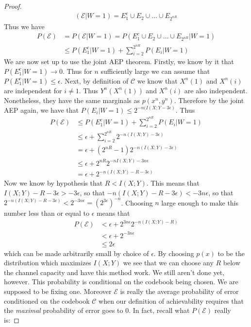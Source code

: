 \documentclass{article}
\theoremstyle{definition}
\theoremstyle{plain}
\begin{document}
\begin{proof}
\begin{align}
	(\mathcal{E}|W=1) = E_1^c \cup E_2 \cup \ldots \cup E_{2^{nR}}
\end{align}
Thus we have
\begin{align}
	P(\mathcal{E}) &= P(\mathcal{E}|W=1) = P(E_1^c \cup E_2 \cup \ldots \cup E_{2^{nR}}|W=1) \\
		&\leq P(E_1^c|W=1) + \sum_{i=2}^{2^{nR}}P(E_i|W=1)
\end{align}
We are now set up to use the joint AEP theorem. Firstly, we know by it that $P(E^c_1|W=1) \to 0$. Thus for $n$ sufficiently large we can assume that $P(E^c_1|W=1) \leq \epsilon$. Next, by definition of $\mathcal{C}$ we know that $X^n(1)$ and $X^n(i)$ are independent for $i \neq 1$. Thus $Y^n(X^n(1))$ and $X^n(i)$ are also independent. Nonetheless, they have the same marginals as $p(x^n,y^n)$. Therefore by the joint AEP again, we have that $P(E_i|W=1) \leq 2^{-n(I(X;Y-3\epsilon)}$. Thus
\begin{align}
	P(\mathcal{E}) &\leq P(E_1^c|W=1) + \sum_{i=2}^{2^{nR}}P(E_i|W=1) \\
				&\leq \epsilon + \sum_{i=2}^{2^{nR}}2^{-n(I(X;Y)-3\epsilon)} \\
				&= \epsilon +(2^{nR}-1)2^{-n(I(X;Y)-3\epsilon)} \\
				&\leq \epsilon + 2^{nR}2^{-nI(X;Y)-3n\epsilon} \\
				&= \epsilon + 2^{-n(I(X;Y)-R-3\epsilon)}
\end{align}
Now we know by hypothesis that $R < I(X;Y)$. This means that $I(X;Y)-R-3\epsilon > -3\epsilon$, so that $-n(I(X;Y)-R-3\epsilon)<-3n\epsilon$, so that $2^{-n(I(X;Y)-R-3\epsilon)} < 2^{-3n\epsilon} = (2^{3\epsilon})^{-n}$. Choosing $n$ large enough to make this number less than or equal to $\epsilon$ means that 
\begin{align}
	P(\mathcal{E}) &< \epsilon + 2^{3n\epsilon}2^{-n(I(X;Y)-R)} \\
				&<\epsilon + 2^{-3n\epsilon} \\
				&\leq 2\epsilon
\end{align}
which can be made arbitrarily small by choice of $\epsilon$. By choosing $p(x)$ to be the distribution which maximizes $I(X;Y)$ we see that we can choose any $R$ below the channel capacity and have this method work. We still aren't done yet, however. This probability is conditional on the codebook being chosen. We are supposed to be fixing one. Moreover $\mathcal{E}$ is really the average probability of error conditioned on the codebook $\mathcal{C}$ when our definition of achievability requires that the \emph{maximal} probability of error goes to $0$. In fact, recall what $P(\mathcal{E})$ really is:

\end{proof}
\end{document}
